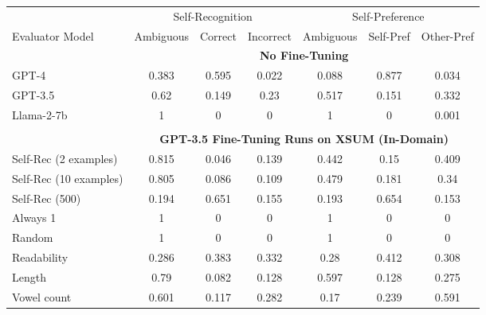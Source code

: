 \begin{table}[h]
    \centering
    \begin{tabular}{l|cccccc}
                                           & \multicolumn{3}{c}{Self-Recognition} & \multicolumn{3}{c}{Self-Preference}\\ 
        Evaluator Model                    & Ambiguous & Correct & Incorrect & Ambiguous & Self-Pref & Other-Pref \\
        \hline
        & \multicolumn{6}{c}{\textbf{No Fine-Tuning}} \\
        GPT-4                              & 0.383       & 0.595     & 0.022        & 0.088       & 0.877     & 0.034       \\
        GPT-3.5                            & 0.62        & 0.149     & 0.23         & 0.517       & 0.151     & 0.332       \\
        Llama-2-7b                         & 1           & 0         & 0            & 1           & 0         & 0.001       \\
        \multicolumn{7}{c}{} \\
        \multicolumn{1}{c}{} & \multicolumn{6}{c}{\textbf{GPT-3.5 Fine-Tuning Runs on XSUM (In-Domain)}} \\
        Self-Rec (2 examples)              & 0.815       & 0.046     & 0.139        & 0.442       & 0.15      & 0.409       \\
        Self-Rec (10 examples)             & 0.805       & 0.086     & 0.109        & 0.479       & 0.181     & 0.34        \\
        Self-Rec (500)                     & 0.194       & 0.651     & 0.155        & 0.193       & 0.654     & 0.153       \\
        Always 1                           & 1           & 0         & 0            & 1           & 0         & 0           \\
        Random                             & 1           & 0         & 0            & 1           & 0         & 0           \\
        Readability                        & 0.286       & 0.383     & 0.332        & 0.28        & 0.412     & 0.308       \\
        Length                             & 0.79        & 0.082     & 0.128        & 0.597       & 0.128     & 0.275       \\
        Vowel count                        & 0.601       & 0.117     & 0.282        & 0.17        & 0.239     & 0.591       \\

\end{tabular}
\end{table}
